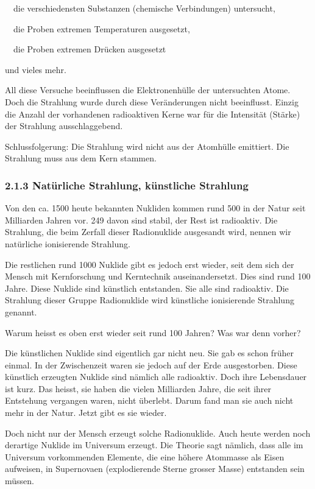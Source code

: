 \documentclass[12pt,a4paper,twoside]{article}
\begin{document}
{\textbullet}\ \ die verschiedensten Substanzen (chemische Verbindungen) untersucht,

{\textbullet}\ \ die Proben extremen Temperaturen ausgesetzt,

{\textbullet}\ \ die Proben extremen Drücken ausgesetzt

und vieles mehr.

All diese Versuche beeinflussen die Elektronenhülle der untersuchten Atome. Doch die Strahlung wurde durch diese Veränderungen nicht beeinflusst. Einzig die Anzahl der vorhandenen radioaktiven Kerne war für die Intensität (Stärke) der Strahlung ausschlaggebend.

Schlussfolgerung: Die Strahlung wird nicht aus der Atomhülle emittiert. Die Strahlung muss aus dem Kern stammen.

\subsubsection{2.1.3 Natürliche Strahlung, künstliche Strahlung}

\bigskip

Von den ca. 1500 heute bekannten Nukliden kommen rund 500 in der Natur seit Milliarden Jahren vor. 249 davon sind stabil, der Rest ist radioaktiv. Die Strahlung, die beim Zerfall dieser Radionuklide ausgesandt wird, nennen wir natürliche ionisierende Strahlung.

Die restlichen rund 1000 Nuklide gibt es jedoch erst wieder, seit dem sich der Mensch mit Kernforschung und Kerntechnik auseinandersetzt. Dies sind rund 100 Jahre. Diese Nuklide sind künstlich entstanden. Sie alle sind radioaktiv. Die Strahlung dieser Gruppe Radionuklide wird künstliche ionisierende Strahlung genannt.

Warum heisst es oben {\quotedblbase}erst wieder seit rund 100 Jahren{\quotedblbase}? Was war denn vorher?

Die künstlichen Nuklide sind eigentlich gar nicht neu. Sie gab es schon früher einmal. In der Zwischenzeit waren sie jedoch auf der Erde ausgestorben. Diese künstlich erzeugten Nuklide sind nämlich alle radioaktiv. Doch ihre Lebensdauer ist kurz. Das heisst, sie haben die vielen Milliarden Jahre, die seit ihrer Entstehung vergangen waren, nicht überlebt. Darum fand man sie auch nicht mehr in der Natur. Jetzt gibt es sie wieder.

Doch nicht nur der Mensch erzeugt solche Radionuklide. Auch heute werden noch derartige Nuklide im Universum erzeugt. Die Theorie sagt nämlich, dass alle im Universum vorkommenden Elemente, die eine höhere Atommasse als Eisen aufweisen, in Supernovaen (explodierende Sterne grosser Masse) entstanden sein müssen.
\end{document}
